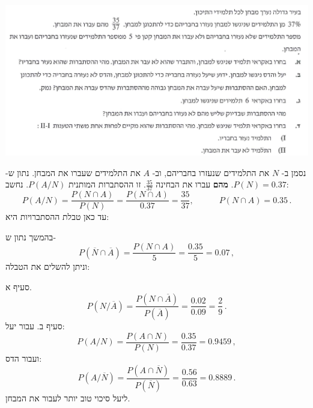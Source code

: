 \documentclass[12pt,a4paper]{article}
\newcommand{\bover}[1]{\bm{\overline{#1}}}
\begin{document}
\begin{center}
\includegraphics[width=\textwidth]{summer-2018a-3}
\end{center}
נסמן ב-%
$N$
את התלמידים שנעזרו בחבריהם, וב-%
$A$
את התלמידים שעברו את המבחן. נתון ש-%
$P(N)=0.37$.
\textbf{מהם}
עברו את הבחינה 
$\displaystyle\frac{35}{37}$.
זו ההסתברות המותנית
$P(A/N)$.
נחשב:
\[
P(A/N) = \frac{P(N\cap A)}{P(N)} = \frac{P(N\cap A)}{0.37}=\frac{35}{37},\quad\quad\quad P(N\cap A)=0.35\,.
\]
עד כאן טבלת ההסתברויות היא:
\begin{center}
\end{center}
בהמשך נתון ש-%
\[
P(\overline{N}\cap\overline{A})=\frac{P(N\cap A)}{5}=\frac{0.35}{5}=0.07\,,
\]
וניתן להשלים את הטבלה:
\begin{center}
\end{center}
סעיף א.
\[
P(N/\overline{A})=\frac{P(N\cap \overline{A})}{P(\overline{A})}=\frac{0.02}{0.09}=\frac{2}{9}\,.
\]
סעיף ב. עבור יעל:
\[
P(A/N)=\frac{P(A \cap N)}{P(N)}=\frac{0.35}{0.37}=0.9459\,,
\]
ועבור הדס:
\[
P(A/\overline{N})=\frac{P(A\cap \overline{N})}{P(\overline{N})}=\frac{0.56}{0.63}=0.8889\,.
\]
ליעל סיכוי טוב יותר לעבור את המבחן.
\end{document}
